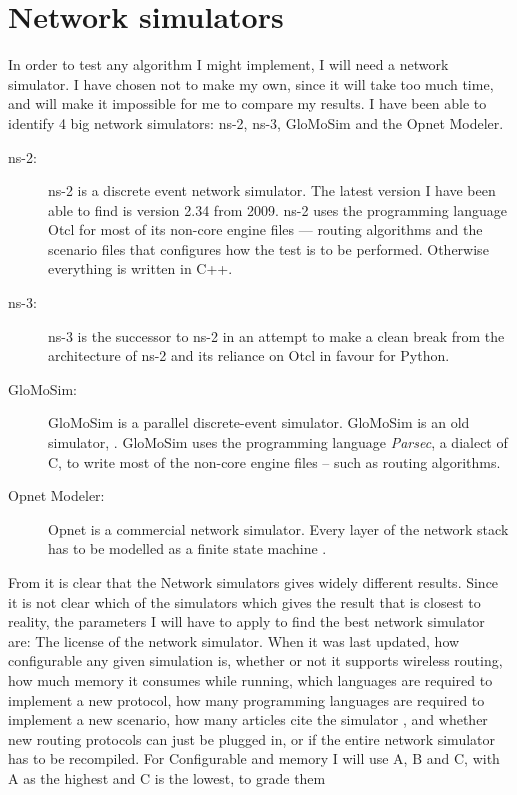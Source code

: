 \section{Network simulators}

In order to test any algorithm I might implement, I will need a network simulator. I have chosen not to make my own, since it will take too much time, and will make it impossible for me to compare my results. I have been able to identify 4 big network simulators: ns-2, ns-3, GloMoSim and the Opnet Modeler.

\begin{description}
\item[ns-2:] ns-2 is a discrete event network simulator. The latest version I have been able to find is version 2.34 from 2009. ns-2 uses the programming language Otcl for most of its non-core engine files ---  routing algorithms and the scenario files that configures how the test is to be performed. Otherwise everything is written in C++.
\item[ns-3:] ns-3 is the successor to ns-2 in an attempt to make a clean break from the architecture of ns-2 and its reliance on Otcl in favour for Python.
\item[GloMoSim:] GloMoSim is a parallel discrete-event simulator. GloMoSim is an old simulator, . GloMoSim uses the programming language \emph{Parsec}, a dialect of C, to write most of the non-core engine files -- such as routing algorithms. 
\item[Opnet Modeler:] Opnet is a commercial network simulator. Every layer of the network stack has to be modelled as a finite state machine \cite{MANcom}. 
\end{description}

From \cite{MANcom} it is clear that the Network simulators gives widely different results. Since it is not clear which of the simulators which gives the result that is closest to reality, the parameters I will have to apply to find the best network simulator are: The license of the network simulator. When it was last updated, how configurable any given simulation is, whether or not it supports wireless routing, how much memory it consumes while running, which languages are required to implement a new protocol, how many programming languages are required to implement a new scenario, how many articles cite the simulator , and whether new routing protocols can just be plugged in, or if the entire network simulator has to be recompiled. For Configurable and memory I will use A, B and C, with A as the highest and C is the lowest, to grade them

